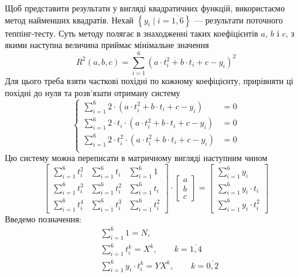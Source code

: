 Щоб представити результати у вигляді квадратичних функцій, використаємо
метод найменших квадратів.
Нехай $\left\{ y_i \mid i=\overline{1, 6} \right\}$ --- результати поточного
теппінг-тесту.
Суть методу полягає в знаходженні таких коефіцієнтів $a$, $b$ і $c$, з якими
наступна величина приймає мінімальне значення
\begin{equation*}
  R^2\left( a, b, c \right)
  = \sum_{i=1}^{6} \left( a \cdot t_i^2 + b \cdot t_i + c - y_i \right)^2
\end{equation*}
Для цього треба взяти часткові похідні по кожному коефіцієнту, прирівняти ці
похідні до нуля та розв’язати отриману систему
\begin{equation*}
  \begin{cases}
    \sum_{i=1}^{6} 2 \cdot \left( a \cdot t_i^2 + b \cdot t_i + c - y_i \right)
    &= 0 \\
    \sum_{i=1}^{6} 2 \cdot t_i
      \cdot \left( a \cdot t_i^2 + b \cdot t_i + c - y_i \right)
    &= 0 \\
    \sum_{i=1}^{6} 2 \cdot t_i^2
      \cdot \left( a \cdot t_i^2 + b \cdot t_i + c - y_i \right)
    &= 0 \\
  \end{cases}
\end{equation*}
Цю систему можна переписати в матричному вигляді наступним чином
\begin{equation*}
  \begin{bmatrix}
    \sum_{i=1}^{6} t_i^2 & \sum_{i=1}^{6} t_i   & \sum_{i=1}^{6} 1 \\
    \sum_{i=1}^{6} t_i^3 & \sum_{i=1}^{6} t_i^2 & \sum_{i=1}^{6} t_i \\
    \sum_{i=1}^{6} t_i^4 & \sum_{i=1}^{6} t_i^3 & \sum_{i=1}^{6} t_i^2
  \end{bmatrix}
  \cdot
  \begin{bmatrix}
    a \\
    b \\
    c
  \end{bmatrix}
  =
  \begin{bmatrix}
    \sum_{i=1}^{6} y_i \\
    \sum_{i=1}^{6} y_i \cdot t_i \\
    \sum_{i=1}^{6} y_i \cdot t_i^2
  \end{bmatrix}
\end{equation*}
Введемо позначення:
\begin{equation*}
  \begin{split}
    &\sum_{i=1}^{6} 1 = N, \\
    &\sum_{i=1}^{6} t_i^k = X^k,\qquad k=\overline{1, 4} \\
    &\sum_{i=1}^{6} y_i \cdot t_i^k = YX^k,\qquad k=\overline{0, 2}
  \end{split}
\end{equation*}
